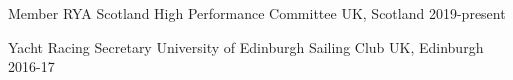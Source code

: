 


\begin{cvhonors}
  \cvhonor
    {Member} %
    {RYA Scotland High Performance Committee} %
    {UK, Scotland} %
    {2019-present} %

  \cvhonor
    {Yacht Racing Secretary} %
    {University of Edinburgh Sailing Club} %
    {UK, Edinburgh} %
    {2016-17} %

\end{cvhonors}